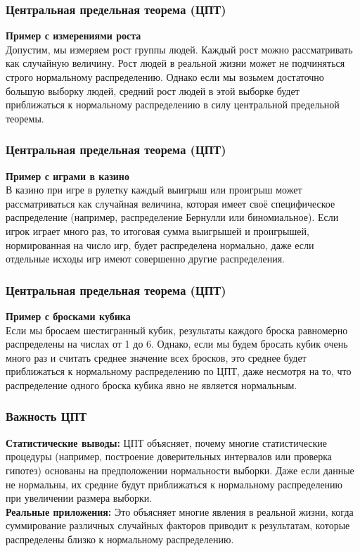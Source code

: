 \documentclass[aspectratio=169]{beamer}
\begin{document}
\begin{frame}
\frametitle{Центральная предельная теорема (ЦПТ)}
{\bf Пример с измерениями роста}\\
Допустим, мы измеряем рост группы людей. Каждый рост можно рассматривать как случайную величину. Рост людей в реальной жизни может не подчиняться строго нормальному распределению. Однако если мы возьмем достаточно большую выборку людей, средний рост людей в этой выборке будет приближаться к нормальному распределению в силу центральной предельной теоремы.
\end{frame}

\begin{frame}
\frametitle{Центральная предельная теорема (ЦПТ)}
{\bf Пример с играми в казино}\\
В казино при игре в рулетку каждый выигрыш или проигрыш может рассматриваться как случайная величина, которая имеет своё специфическое распределение (например, распределение Бернулли или биномиальное). Если игрок играет много раз, то итоговая сумма выигрышей и проигрышей, нормированная на число игр, будет распределена нормально, даже если отдельные исходы игр имеют совершенно другие распределения.
\end{frame}

\begin{frame}
\frametitle{Центральная предельная теорема (ЦПТ)}
{\bf Пример с бросками кубика}\\
Если мы бросаем шестигранный кубик, результаты каждого броска равномерно распределены на числах от 1 до 6. Однако, если мы будем бросать кубик очень много раз и считать среднее значение всех бросков, это среднее будет приближаться к нормальному распределению по ЦПТ, даже несмотря на то, что распределение одного броска кубика явно не является нормальным.
\end{frame}

\begin{frame}
\frametitle{Важность ЦПТ}
{\bf Статистические выводы:} ЦПТ объясняет, почему многие статистические процедуры (например, построение доверительных интервалов или проверка гипотез) основаны на предположении нормальности выборки. Даже если данные не нормальны, их средние будут приближаться к нормальному распределению при увеличении размера выборки.
\newline\\
{\bf Реальные приложения:} Это объясняет многие явления в реальной жизни, когда суммирование различных случайных факторов приводит к результатам, которые распределены близко к нормальному распределению.
\end{frame}
\end{document}
